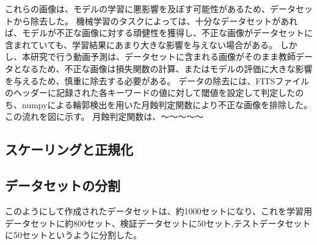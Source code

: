 これらの画像は、モデルの学習に悪影響を及ぼす可能性があるため、データセットから除去した。
機械学習のタスクによっては、十分なデータセットがあれば、モデルが不正な画像に対する頑健性を獲得し、不正な画像がデータセットに含まれていても、学習結果にあまり大きな影響を与えない場合がある。
しかし、本研究で行う動画予測は、データセットに含まれる画像がそのまま教師データとなるため、不正な画像は損失関数の計算、またはモデルの評価に大きな影響を与えるため、慎重に除去する必要がある。
データの除去には、FITSファイルのヘッダーに記録された各キーワードの値に対して閾値を設定して判定したのち、numpyによる輪郭検出を用いた月蝕判定関数により不正な画像を排除した。この流れを図に示す。
月蝕判定関数は、〜〜〜〜〜

\subsection{スケーリングと正規化}

\subsection{データセットの分割}

このようにして作成されたデータセットは、約1000セットになり、これを学習用データセットに約800セット、検証データセットに50セット,テストデータセットに50セットというように分割した。



